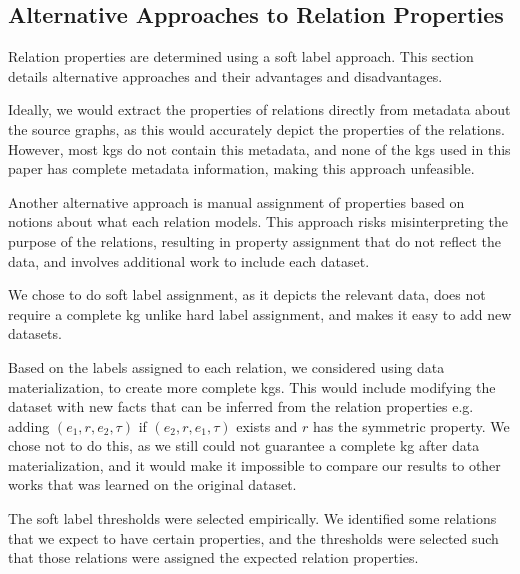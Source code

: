 \subsection{Alternative Approaches to Relation Properties}
\label{sec:alt_approaches_to_relation_properties}
Relation properties are determined using a soft label approach. This section details alternative approaches and their advantages and disadvantages.

Ideally, we would extract the properties of relations directly from metadata about the source graphs, as this would accurately depict the properties of the relations. However, most \glspl{kg} do not contain this metadata, and none of the \glspl{kg} used in this paper has complete metadata information, making this approach unfeasible.

Another alternative approach is manual assignment of properties based on notions about what each relation models. This approach risks misinterpreting the purpose of the relations, resulting in property assignment that do not reflect the data, and involves additional work to include each dataset.

We chose to do soft label assignment, as it depicts the relevant data, does not require a complete \gls{kg} unlike hard label assignment, and makes it easy to add new datasets.

Based on the labels assigned to each relation, we considered using data materialization, to create more complete \glspl{kg}. This would include modifying the dataset with new facts that can be inferred from the relation properties e.g. adding $(e_1, r, e_2, \tau)$ if $(e_2, r, e_1, \tau)$ exists and $r$ has the symmetric property.
We chose not to do this, as we still could not guarantee a complete \gls{kg} after data materialization, and it would make it impossible to compare our results to other works that was learned on the original dataset.

The soft label thresholds were selected empirically. We identified some relations that we expect to have certain properties, and the thresholds were selected such that those relations were assigned the expected relation properties.